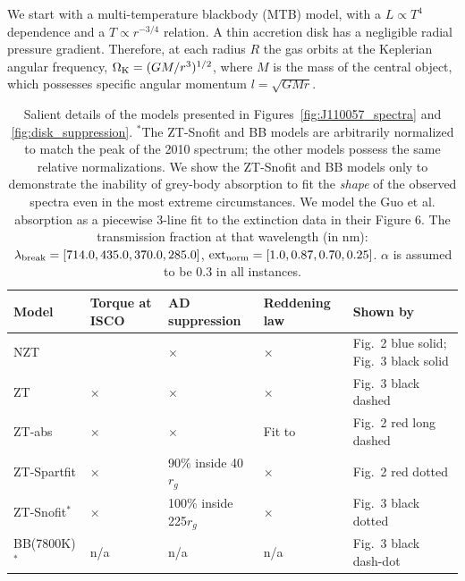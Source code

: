 \documentclass[a4paper,fleqn,usenatbib]{mnras}
\newcommand{\cmark}{\ding{51}}%
\begin{document}
We start with a multi-temperature blackbody (MTB) model, with a $L
\propto T^4$ dependence and a $T \propto r^{-3/4}$ relation. A thin
accretion disk has a negligible radial pressure gradient. Therefore,
at each radius $R$ the gas orbits at the Keplerian angular frequency,
$\Omega_{\rm K} = (GM/r^{3})^{1/2}$, where $M$ is the mass of the
central object, which possesses specific angular momentum $l=
\sqrt{GMr}$.

\begin{table}
  \centering
  \begin{tabular}{l l l l l }
    \hline \hline 
    Model       &   Torque at ISCO  & AD suppression        &  Reddening law        &  Shown by \\
    \hline
    NZT            & \cmark        &  $\times$                        &   $\times$                            & Fig.~2 blue solid; Fig.~3 black solid \\
    ZT               &  $\times$    &  $\times$                        &   $\times$                            & Fig.~3 black dashed          \\
    ZT-abs              &  $\times$     &  $\times$                       &  Fit to \citet{Guo2016}   & Fig.~2 red long dashed   \\
    ZT-Spartfit  &  $\times$    &  90\%  inside 40$r_g$     &  $\times$                              & Fig.~2 red dotted              \\
    ZT-Snofit$^{*}$  &  $\times$     &  100\% inside 225$r_g$  &    $\times$            &  Fig.~3 black dotted         \\
    BB(7800K)$^{*}$  &   n/a             &   n/a                               &  n/a                         & Fig.~3 black dash-dot     \\
    \hline 
    \hline 
  \end{tabular}
  \caption{Salient details of the models presented in Figures~\ref{fig:J110057_spectra} and 
  \ref{fig:disk_suppression}. 
$^{*}$The ZT-Snofit and BB models are arbitrarily normalized to match the peak of the 2010 spectrum; the other models possess the same relative normalizations. 
%
We show the ZT-Snofit and BB models only to demonstrate the inability of grey-body absorption to fit the {\it shape} of the observed spectra even in the most extreme circumstances. We model the 
Guo et al. absorption as a piecewise 3-line fit to the extinction data in their Figure 6. 
The transmission fraction at that wavelength (in nm): 
$\lambda_{\rm break}=[714.0,435.0,370.0,285.0]$, ${\rm ext}_{\rm norm}=[1.0,0.87,0.70,0.25]$.
%
$\alpha$ is assumed to be 0.3 in all instances.
} 
 \label{tab:models}
\end{table}
\end{document}
